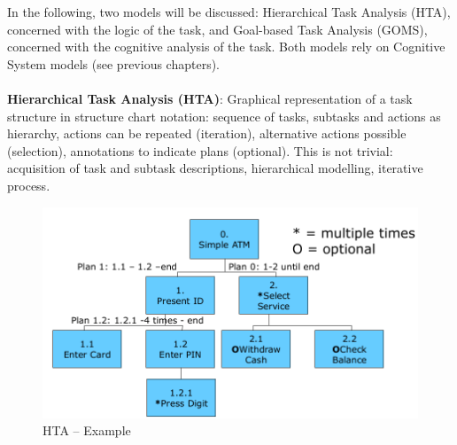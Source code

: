 In the following, two models will be discussed: Hierarchical Task Analysis (HTA), concerned with the logic of the task, and Goal-based Task Analysis (GOMS), concerned with the cognitive analysis of the task. Both models rely on Cognitive System models (see previous chapters).\\ \\ 
\textbf{Hierarchical Task Analysis (HTA)}: 
Graphical representation of a task structure in structure chart notation: sequence of tasks, subtasks and actions as hierarchy, actions can be repeated (iteration), alternative actions possible (selection), annotations to indicate plans (optional). This is not trivial: acquisition of task and subtask descriptions, hierarchical modelling, iterative process.
\begin{figure}[h!]
	\centering
	\includegraphics[width=.5\textwidth]{img/ch05_hta.png}
	\caption{HTA -- Example}
	\label{hta}
\end{figure}

